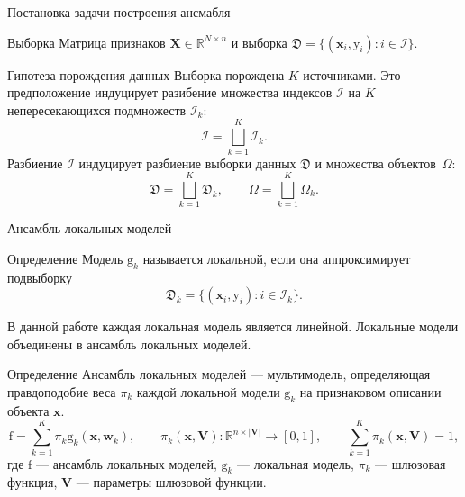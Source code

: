 \documentclass[9pt,pdf,hyperref={unicode}]{beamer}
\begin{document}
\begin{frame}{Постановка задачи построения ансмабля}
\begin{block}{Выборка}
Матрица признаков $\mathbf{X} \in \mathbb{R}^{N\times n}$ и выборка $\mathfrak{D} = \{(\mathbf{x}_i, \mathrm{y}_i): i \in \mathcal{I}\}$.
\end{block}
\begin{block}{Гипотеза порождения данных}
Выборка порождена $K$ источниками. Это предположение индуцирует разибение множества индексов $\mathcal{I}$ на $K$ непересекающихся подмножеств $\mathcal{I}_k$:
    \[\mathcal{I} = \bigsqcup_{k=1}^K \mathcal{I}_k.\]
Разбиение $\mathcal{I}$ индуцирует разбиение выборки данных $\mathfrak{D}$ и множества объектов~$\Omega$:
    \[\mathfrak{D} = \bigsqcup_{k=1}^K \mathfrak{D}_k, \qquad \Omega = \bigsqcup_{k=1}^K \Omega_k. \]
\end{block}
    
\end{frame}


\begin{frame}{Ансамбль локальных моделей}
    \begin{block}{Определение}
            Модель $ \mathrm{g}_k$ называется локальной, если она аппроксимирует подвыборку 
            \[\mathfrak{D}_k = \{(\mathbf{x}_i, \mathrm{y}_i): i \in \mathcal{I}_k\}.\]
    
    \end{block}

В данной работе каждая локальная модель является линейной. Локальные модели объединены в ансамбль локальных моделей. 
    \begin{block}{Определение}
        Ансамбль локальных моделей — мультимодель, определяющая правдоподобие веса $\pi_k$ каждой локальной модели $\mathrm{g}_k$ на признаковом описании объекта $\mathbf{x}$.
\[\mathrm{f} = \sum\limits_{k=1}^K \pi_k \mathrm{g}_k(\mathbf{x}, \mathbf{w}_k), \qquad \pi_k(\mathbf{x}, \mathbf{V}): \mathbb{R}^{n\times |\mathbf{V}|}\rightarrow [0,1], \qquad \sum_{k=1}^K \pi_k(\mathbf{x}, \mathbf{V}) = 1, \]
где $\mathrm{f}$ --- ансамбль локальных моделей, $\mathrm{g}_k$ --- локальная модель,  $\pi_k$ --- шлюзовая функция, $\mathbf{V}$ --- параметры шлюзовой функции.

    \end{block}
\end{frame}
\end{document}
